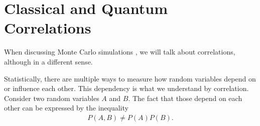 


\section{Classical and Quantum Correlations}

When discussing Monte Carlo simulations , we will talk about correlations, although in a different sense.

Statistically, there are multiple ways to measure how random variables depend on or influence each other. This dependency is what we understand by correlation. Consider two random variables $A$ and $B$. The fact that those depend on each other can be expressed by the inequality 
\begin{align*}
P(A,B) \neq P(A)P(B).
\end{align*}

